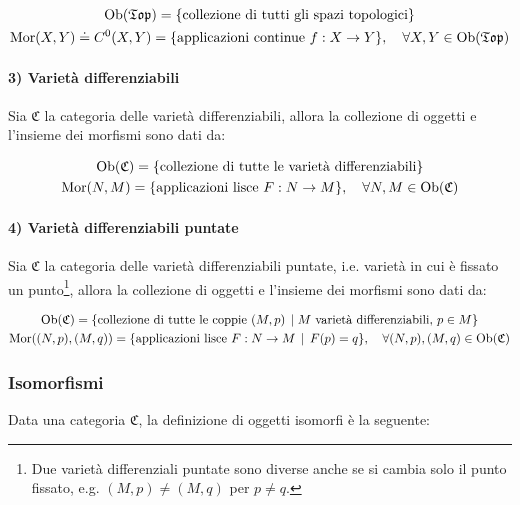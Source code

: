\begin{gather}
	\ob(\mathfrak{Top}) = \{ \text{collezione di tutti gli spazi topologici} \} \\
	\mor(X,Y) \doteq C^{0}(X,Y) = \{ \text{applicazioni continue } f : X \to Y \} \qcomma \forall X,Y \in \ob(\mathfrak{Top})
\end{gather}

\paragraph{3) Varietà differenziabili}

Sia $ \mathfrak{C} $ la categoria delle varietà differenziabili, allora la collezione di oggetti e l'insieme dei morfismi sono dati da:

\begin{gather}
	\ob(\mathfrak{C}) = \{ \text{collezione di tutte le varietà differenziabili} \} \\
	\mor(N,M) = \{ \text{applicazioni lisce } F : N \to M \} \qcomma \forall N,M \in \ob(\mathfrak{C})
\end{gather}

\paragraph{4) Varietà differenziabili puntate}

Sia $ \mathfrak{C} $ la categoria delle varietà differenziabili puntate, i.e. varietà in cui è fissato un punto\footnote{%
	Due varietà differenziali puntate sono diverse anche se si cambia solo il punto fissato, e.g. $ (M,p) \neq (M,q) $ per $ p \neq q $.%
}, allora la collezione di oggetti e l'insieme dei morfismi sono dati da:

\begin{gather}
	\ob(\mathfrak{C}) = \{ \text{collezione di tutte le coppie } (M,p) \, \mid M \text{ varietà differenziabili}, \, p \in M \} \\
		\mor((N,p),(M,q)) = \{ \text{applicazioni lisce } F : N \to M \, \mid \, F(p)=q \} \qcomma \forall (N,p),(M,q) \in \ob(\mathfrak{C})
\end{gather}

\subsubsection{Isomorfismi}

Data una categoria $ \mathfrak{C} $, la definizione di oggetti isomorfi è la seguente:

